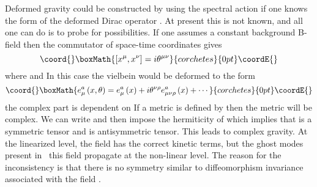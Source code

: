 \documentclass[a4paper,12pt]{article}
\begin{document}
Deformed gravity could be constructed by using the spectral action if one
knows the form of the deformed Dirac operator \coordHE{}. At present this
is not known, and all one can do is to probe for possibilities. If one assumes
a constant background B-field then the commutator of space-time coordinates
gives%
\[\coord{}\boxMath{
\left[  x^{\mu},x^{\nu}\right]  =i\theta^{\mu\nu}%
}{corchetes}{0pt}\coordE{}\]
where \coordHE{} and \coordHE{} In this case the vielbein
would be deformed to the form%
\[\coord{}\boxMath{
e_{\mu}^{a}\left(  x,\theta\right)  =e_{\mu}^{a}\left(  x\right)
+i\theta^{\nu\rho}e_{\mu\nu\rho}^{a}\left(  x\right)  +\cdots
}{corchetes}{0pt}\coordE{}\]
the complex part is dependent on \coordHE{} If a metric is defined by
\coordHE{} then the metric will be complex. We can
write \coordHE{} and then impose the hermiticity of
\coordHE{} which implies that \coordHE{} is a symmetric tensor and
\coordHE{} is antisymmetric tensor. This leads to complex gravity. At the
linearized level, the field \coordHE{} has the correct kinetic terms, but
the ghost modes present in \ this field propagate at the non-linear level. The
reason for the inconsistency is that there is no symmetry similar to
diffeomorphism invariance associated with the field \coordHE{} \cite{ali1}.
\end{document}
